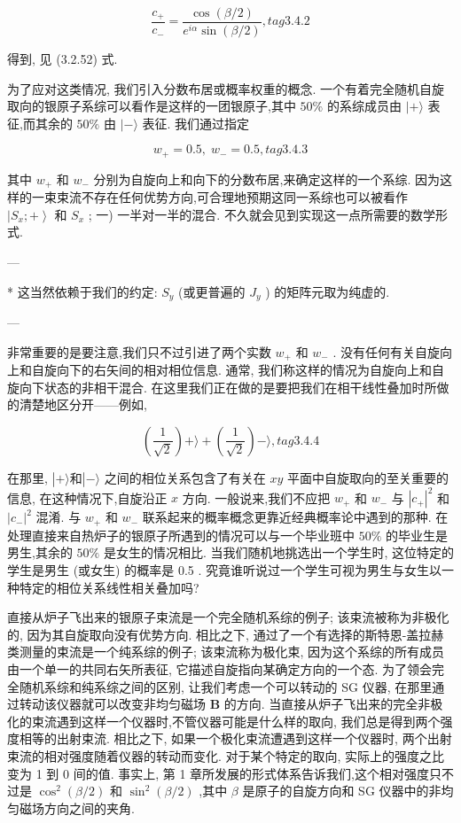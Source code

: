 $$
\frac{{c}_{ + }}{{c}_{ - }} = \frac{\cos \left( {\beta /2}\right) }{{e}^{i\alpha }\sin \left( {\beta /2}\right) }, tag{3. 4.2}
$$

得到, 见 (3.2.52) 式.

为了应对这类情况, 我们引入分数布居或概率权重的概念. 一个有着完全随机自旋取向的银原子系综可以看作是这样的一团银原子,其中 ${50}\%$ 的系综成员由 $| + \rangle$ 表征,而其余的 ${50}\%$ 由 $| - \rangle$ 表征. 我们通过指定

$$
{w}_{ + } = {0.5},\;{w}_{ - } = {0.5}, tag{3.4.3}
$$

其中 ${w}_{ + }$ 和 ${w}_{ - }$ 分别为自旋向上和向下的分数布居,来确定这样的一个系综. 因为这样的一束束流不存在任何优势方向,可合理地预期这同一系综也可以被看作 $\left| {{S}_{x}; + }\right\rangle$ 和 ${S}_{x}$ ; 一) 一半对一半的混合. 不久就会见到实现这一点所需要的数学形式.

---

* 这当然依赖于我们的约定: ${S}_{y}$ (或更普遍的 ${J}_{y}$ ) 的矩阵元取为纯虚的.

---

非常重要的是要注意,我们只不过引进了两个实数 ${w}_{ + }$ 和 ${w}_{ - }$ . 没有任何有关自旋向上和自旋向下的右矢间的相对相位信息. 通常, 我们称这样的情况为自旋向上和自旋向下状态的非相干混合. 在这里我们正在做的是要把我们在相干线性叠加时所做的清楚地区分开——例如,

$$
\left( \frac{1}{\sqrt{2}}\right) + \rangle + \left( \frac{1}{\sqrt{2}}\right) - \rangle , tag{3. 4.4}
$$

在那里, $\left| {+\rangle \text{和}}\right| - \rangle$ 之间的相位关系包含了有关在 ${xy}$ 平面中自旋取向的至关重要的信息, 在这种情况下,自旋沿正 $x$ 方向. 一般说来,我们不应把 ${w}_{ + }$ 和 ${w}_{ - }$ 与 ${\left| {c}_{ + }\right| }^{2}$ 和 ${\left| {c}_{ - }\right| }^{2}$ 混淆. 与 ${w}_{ + }$ 和 ${w}_{ - }$ 联系起来的概率概念更靠近经典概率论中遇到的那种. 在处理直接来自热炉子的银原子所遇到的情况可以与一个毕业班中 ${50}\%$ 的毕业生是男生,其余的 ${50}\%$ 是女生的情况相比. 当我们随机地挑选出一个学生时, 这位特定的学生是男生 (或女生) 的概率是 0.5 . 究竟谁听说过一个学生可视为男生与女生以一种特定的相位关系线性相关叠加吗?

直接从炉子飞出来的银原子束流是一个完全随机系综的例子; 该束流被称为非极化的, 因为其自旋取向没有优势方向. 相比之下, 通过了一个有选择的斯特恩-盖拉赫类测量的束流是一个纯系综的例子; 该束流称为极化束, 因为这个系综的所有成员由一个单一的共同右矢所表征, 它描述自旋指向某确定方向的一个态. 为了领会完全随机系综和纯系综之间的区别, 让我们考虑一个可以转动的 SG 仪器, 在那里通过转动该仪器就可以改变非均匀磁场 $\mathbf{B}$ 的方向. 当直接从炉子飞出来的完全非极化的束流遇到这样一个仪器时,不管仪器可能是什么样的取向, 我们总是得到两个强度相等的出射束流. 相比之下, 如果一个极化束流遭遇到这样一个仪器时, 两个出射束流的相对强度随着仪器的转动而变化. 对于某个特定的取向, 实际上的强度之比变为 1 到 0 间的值. 事实上, 第 1 章所发展的形式体系告诉我们,这个相对强度只不过是 ${\cos }^{2}\left( {\beta /2}\right)$ 和 ${\sin }^{2}\left( {\beta /2}\right)$ ,其中 $\beta$ 是原子的自旋方向和 SG 仪器中的非均匀磁场方向之间的夹角.

